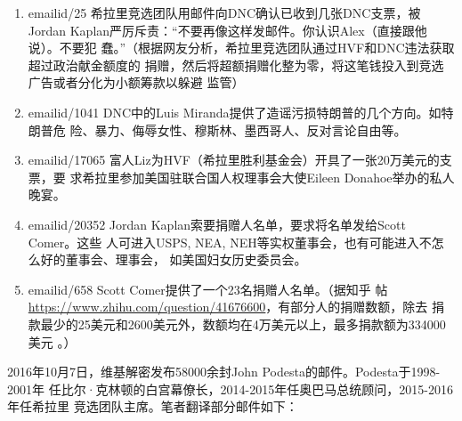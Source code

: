 \begin{enumerate}
\item emailid/25 希拉里竞选团队用邮件向DNC确认已收到几张DNC支票，被Jordan
  Kaplan严厉斥责：“不要再像这样发邮件。你认识Alex（直接跟他说）。不要犯
  蠢。”（根据网友分析，希拉里竞选团队通过HVF和DNC违法获取超过政治献金额度的
  捐赠，然后将超额捐赠化整为零，将这笔钱投入到竞选广告或者分化为小额筹款以躲避
  监管）

\item emailid/1041 DNC中的Luis Miranda提供了造谣污损特朗普的几个方向。如特朗普危
  险、暴力、侮辱女性、穆斯林、墨西哥人、反对言论自由等。

\item emailid/17065 富人Liz为HVF（希拉里胜利基金会）开具了一张20万美元的支票，要
  求希拉里参加美国驻联合国人权理事会大使Eileen Donahoe举办的私人晚宴。

\item emailid/20352 Jordan Kaplan索要捐赠人名单，要求将名单发给Scott Comer。这些
  人可进入USPS, NEA, NEH等实权董事会，也有可能进入不怎么好的董事会、理事会，
  如美国妇女历史委员会。

\item emailid/658 Scott Comer提供了一个23名捐赠人名单。（据知乎
  帖 \url{https://www.zhihu.com/question/41676600}，有部分人的捐赠数额，除去
  捐款最少的25美元和2600美元外，数额均在4万美元以上，最多捐款额为334000美元
  。）
\end{enumerate}

2016年10月7日，维基解密发布58000余封John Podesta的邮件。Podesta于1998-2001年
任比尔·克林顿的白宫幕僚长，2014-2015年任奥巴马总统顾问，2015-2016年任希拉里
竞选团队主席。笔者翻译部分邮件如下：


